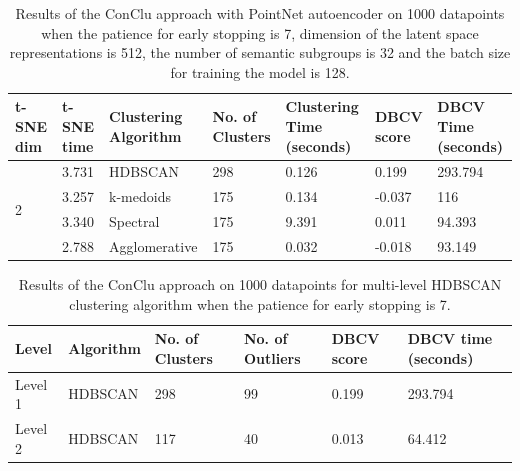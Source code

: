 \begin{table}[H]
  \setlength\extrarowheight{10pt}
  \caption{Results of the ConClu approach with PointNet autoencoder on 1000 datapoints when the patience for early stopping is 7, dimension of the latent space representations is 512, the number of semantic subgroups is 32 and the batch size for training the model is 128. }
  \centering
  \begin{tabular}{|p{30pt}|p{50pt}|p{60pt}|p{50pt}|p{50pt}|p{50pt}|p{40pt}|}
    \toprule
    \ac{t-SNE} dim	& \ac{t-SNE} time & Clustering Algorithm & No. of Clusters & Clustering Time (seconds) & \ac{DBCV} score & \ac{DBCV} Time (seconds)\\
    \midrule
    \multirow{4}{30pt}{2}	& 3.731	& \ac{HDBSCAN}	& 298	& 0.126	& 0.199	& 293.794
    \\ \cline{2-7} 
    & 3.257	& k-medoids	& 175	& 0.134	& -0.037	& 116 \\ \cline{2-7} 
    & 3.340	& Spectral	& 175	& 9.391	& 0.011	& 94.393 \\ \cline{2-7}
    & 2.788	& Agglomerative	& 175	& 0.032	& -0.018	& 93.149 \\ 
    \bottomrule
  \end{tabular}
  \label{tab:conclu_patience_7}
\end{table}

\begin{table}[H]
  \setlength\extrarowheight{10pt}
  \caption{Results of the ConClu approach on 1000 datapoints for multi-level \ac{HDBSCAN} clustering algorithm when the patience for early stopping is 7. }
  \centering
  \begin{tabular}{|l|l|l|l|l|l|}
    \toprule
    Level & Algorithm	& No. of Clusters	& No. of Outliers	& DBCV score	& \ac{DBCV} time (seconds)	\\  
    \midrule
    Level 1 & \ac{HDBSCAN} & 298	& 99	& 0.199	& 293.794 \\ \cline{1-6}
    Level 2 & \ac{HDBSCAN} & 117	& 40	& 0.013	& 64.412
    \\ 
    \bottomrule
  \end{tabular}
  \label{tab:conclu_patience_7_levels}
\end{table}

